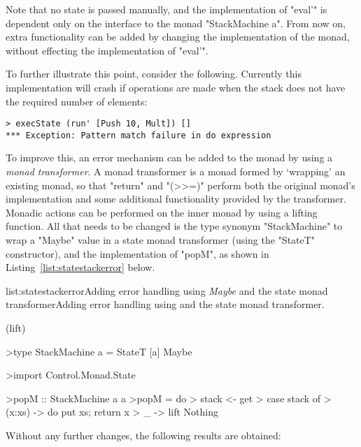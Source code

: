 Note that no state is passed manually, and the implementation of "eval'" is dependent only on the interface to the monad "StackMachine a". From now on, extra functionality can be added by changing the implementation of the monad, without effecting the implementation of "eval'". 

To further illustrate this point, consider the following. Currently this implementation will crash if operations are made when the stack does not have the required number of elements:

\begin{verbatim}
> execState (run' [Push 10, Mult]) []
*** Exception: Pattern match failure in do expression
\end{verbatim}

\noindent To improve this, an error mechanism can be added to the monad by using a \emph{monad transformer}. A monad transformer is a monad formed by `wrapping' an existing monad, so that "return" and "(>>=)" perform both the original monad's implementation and some additional functionality provided by the transformer. Monadic actions can be performed on the inner monad by using a lifting function. All that needs to be changed is the type synonym "StackMachine" to wrap a "Maybe" value in a state monad transformer (using the "StateT" constructor), and the implementation of "popM", as shown in Listing~\ref{list:statestackerror} below.

\vspace{-0.5em}
\begin{listing}{list:statestackerror}{Adding error handling using \emph{Maybe} and the state monad transformer}{Adding error handling using  and the state monad transformer.}{}
\end{listing}\vspace{-1.5em}

\functions(lift)
\begin{haskell}

>type StackMachine a = StateT [a] Maybe

>import Control.Monad.State

>popM :: StackMachine a a
>popM = do
>  stack <- get
>  case stack of
>    (x:xs) -> do put xs; return x
>    _ -> lift Nothing


\end{haskell}
\noindent Without any further changes, the following results are obtained:

